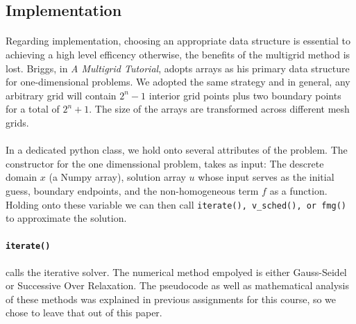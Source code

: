\documentclass[pdftex,12pt,a4paper]{article}
\begin{document}
    \subsection{Implementation}   

        \paragraph*{} Regarding implementation, choosing an appropriate data structure is essential to achieving a high level efficency otherwise, the benefits of the multigrid method is lost.  Briggs, in \textit{A Multigrid Tutorial}, adopts arrays as his primary data structure for one-dimensional problems.  We adopted the same strategy and in general, any arbitrary grid will contain $2^{n}-1$ interior grid points plus two boundary points for a total of $2^{n}+1$.  The size of the arrays are transformed across different mesh grids. 

        \paragraph*{} In a dedicated python class, we hold onto several attributes of the problem. The constructor for the one dimenssional problem, takes as input: The descrete domain $x$ (a Numpy array), solution array $u$ whose input serves as the initial guess, boundary endpoints, and the non-homogeneous term $f$ as a function. Holding onto these variable we can then call \lstinline{iterate(), v_sched(), or fmg()} to approximate the solution.

        \paragraph*{\lstinline{iterate()}}calls the iterative solver. The numerical method empolyed is either Gauss-Seidel or Successive Over Relaxation. The pseudocode as well as mathematical analysis of these methods was explained in previous assignments for this course, so we chose to leave that out of this paper. 
\end{document}

